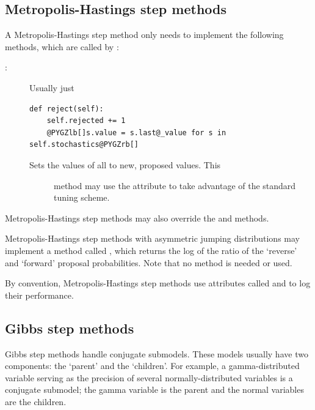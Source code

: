 \documentclass[letterpaper,10pt,english]{sphinxmanual}
\begin{document}
\subsection{Metropolis-Hastings step methods}
\label{extending:metropolis-hastings-step-methods}\label{extending:user-metro}
A Metropolis-Hastings step method only needs to implement the following methods, which are called by :
\begin{description}
\item[{:}] \leavevmode
Usually just

\begin{Verbatim}[commandchars=@\[\]]
def reject(self):
    self.rejected += 1
    @PYGZlb[]s.value = s.last@_value for s in self.stochastics@PYGZrb[]
\end{Verbatim}

\item[{}] \leavevmode\begin{description}
\item[{Sets the values of all  to new, proposed values. This}] \leavevmode
method may use the  attribute to take advantage of
the standard tuning scheme.

\end{description}

\end{description}

Metropolis-Hastings step methods may also override the  and  methods.

Metropolis-Hastings step methods with asymmetric jumping distributions may implement a method called , which returns the log of the ratio of the `reverse' and `forward' proposal probabilities. Note that no  method is needed or used.

By convention, Metropolis-Hastings step methods use attributes called  and  to log their performance.


\subsection{Gibbs step methods}
\label{extending:gibbs-step-methods}\label{extending:user-gibbs}
Gibbs step methods handle conjugate submodels. These models usually have two components: the `parent' and the `children'. For example, a gamma-distributed variable serving as the precision of several normally-distributed variables is a conjugate submodel; the gamma variable is the parent and the normal variables are the children.
\end{document}
